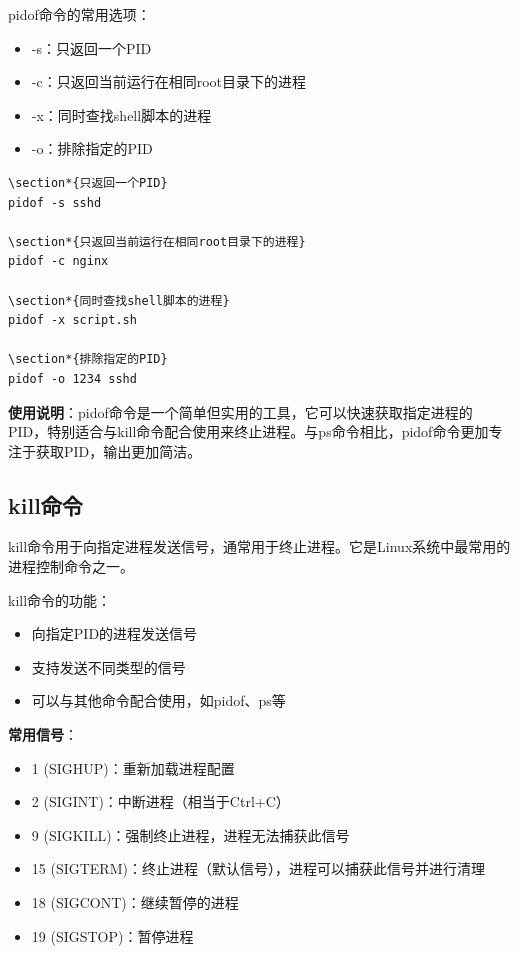 \documentclass[12pt,UTF8]{ctexbook}
\begin{document}
pidof命令的常用选项：
\begin{itemize}
    \item -s：只返回一个PID
    \item -c：只返回当前运行在相同root目录下的进程
    \item -x：同时查找shell脚本的进程
    \item -o：排除指定的PID
\end{itemize}

\begin{verbatim}
\section*{只返回一个PID}
pidof -s sshd

\section*{只返回当前运行在相同root目录下的进程}
pidof -c nginx

\section*{同时查找shell脚本的进程}
pidof -x script.sh

\section*{排除指定的PID}
pidof -o 1234 sshd
\end{verbatim}

\textbf{使用说明}：pidof命令是一个简单但实用的工具，它可以快速获取指定进程的PID，特别适合与kill命令配合使用来终止进程。与ps命令相比，pidof命令更加专注于获取PID，输出更加简洁。

\subsection{kill命令}
kill命令用于向指定进程发送信号，通常用于终止进程。它是Linux系统中最常用的进程控制命令之一。

kill命令的功能：
\begin{itemize}
    \item 向指定PID的进程发送信号
    \item 支持发送不同类型的信号
    \item 可以与其他命令配合使用，如pidof、ps等
\end{itemize}

\textbf{常用信号}：
\begin{itemize}
    \item 1 (SIGHUP)：重新加载进程配置
    \item 2 (SIGINT)：中断进程（相当于Ctrl+C）
    \item 9 (SIGKILL)：强制终止进程，进程无法捕获此信号
    \item 15 (SIGTERM)：终止进程（默认信号），进程可以捕获此信号并进行清理
    \item 18 (SIGCONT)：继续暂停的进程
    \item 19 (SIGSTOP)：暂停进程
\end{itemize}
\end{document}
